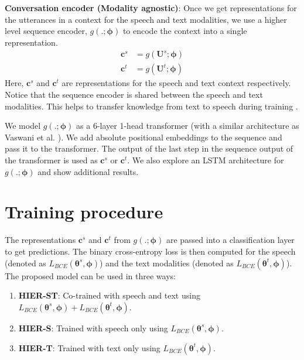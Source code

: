 \documentclass{article}
\begin{document}
\noindent \textbf{Conversation encoder (Modality agnostic)}: Once we get representations for the utterances in a context for the speech and text modalities, we use a higher level sequence encoder, $g(.; \boldsymbol\phi)$ to encode the context into a single representation.
\begin{equation*}
    \begin{split}
        \textbf{c}^s &= g(\textbf{U}^s; \boldsymbol\phi) \\
        \textbf{c}^t &= g(\textbf{U}^t; \boldsymbol\phi)
    \end{split}
\end{equation*}
Here, $\textbf{c}^s$ and $\textbf{c}^t$ are representations for the speech and text context respectively. Notice that the sequence encoder is shared between the speech and text modalities. This helps to transfer knowledge from text to speech during training \cite{rongali2020exploring}.

We model $g(.; \boldsymbol\phi)$ as a 6-layer 1-head transformer (with a similar architecture as Vaswani et al. \cite{vaswani2017attention}). We add absolute positional embeddings to the sequence and pass it to the transformer. The output of the last step in the sequence output of the transformer is used as $\textbf{c}^s$ or $\textbf{c}^t$. We also explore an LSTM architecture for $g(.; \boldsymbol\phi)$ and show additional results.

\section{Training procedure}
\label{sec:train_pro}
The representations $\textbf{c}^s$ and $\textbf{c}^t$ from $g(.; \boldsymbol\phi)$ are passed into a classification layer to get predictions. The binary cross-entropy loss is then computed for the speech (denoted as $L_{BCE}(\boldsymbol\theta^s, \boldsymbol\phi)$) and the text modalities (denoted as $L_{BCE}(\boldsymbol\theta^t, \boldsymbol\phi)$). The proposed model can be used in three ways:
\begin{enumerate}
    \item \textbf{HIER-ST}: Co-trained with speech and text using $L_{BCE}(\boldsymbol\theta^s, \boldsymbol\phi) + L_{BCE}(\boldsymbol\theta^t, \boldsymbol\phi)$.
    \item \textbf{HIER-S}: Trained with speech only using $L_{BCE}(\boldsymbol\theta^s, \boldsymbol\phi)$.
    \item \textbf{HIER-T}: Trained with text only using $L_{BCE}(\boldsymbol\theta^t, \boldsymbol\phi)$.
\end{enumerate}
\end{document}

